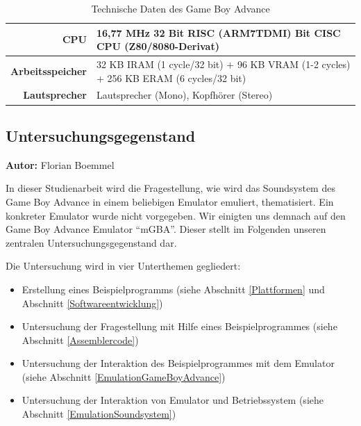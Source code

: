 \documentclass[11pt,a4paper]{scrartcl}
\newcommand{\AutorFlorian} {
    \vspace{-4mm}
    \large \textbf{Autor:} Florian Boemmel \normalsize
    \vspace{2mm}
}
\begin{document}
\begin{table}[h]
    \centering
    \begin{tabular}{ r | p{10cm} }
        \textbf{CPU} & 16,77 MHz 32 Bit RISC (ARM7TDMI)\newline
              8 Bit CISC CPU (Z80/8080-Derivat) \\
        \hline
        \textbf{Arbeitsspeicher} & 32 KB IRAM (1 cycle/32 bit)\newline
                          + 96 KB VRAM (1-2 cycles)\newline
                          + 256 KB ERAM (6 cycles/32 bit) \\
        \hline
        \textbf{Lautsprecher} & Lautsprecher (Mono), Kopfh\"orer (Stereo) \\
    \end{tabular}
    \caption{Technische Daten des Game Boy Advance \cite{GameBoyTechnischeDaten}}
    \label{table:TechnischeDaten}
\end{table}

\newpage

\subsection{Untersuchungsgegenstand}
\AutorFlorian

In dieser Studienarbeit wird die Fragestellung, wie wird das Soundsystem des Game Boy Advance in einem beliebigen Emulator emuliert, thematisiert. Ein konkreter Emulator wurde nicht vorgegeben. Wir einigten uns demnach auf den Game Boy Advance Emulator \enquote{mGBA}. Dieser stellt im Folgenden unseren zentralen Untersuchungsgegenstand dar.

Die Untersuchung wird in vier Unterthemen gegliedert:

\begin{itemize}
    \item Erstellung eines Beispielprogramms (siehe Abschnitt \ref{Plattformen} und Abschnitt \ref{Softwareentwicklung})
    \item Untersuchung der Fragestellung mit Hilfe eines Beispielprogrammes (siehe Abschnitt \ref{Assemblercode})
    \item Untersuchung der Interaktion des Beispielprogrammes mit dem Emulator (siehe Abschnitt \ref{EmulationGameBoyAdvance})
    \item Untersuchung der Interaktion von Emulator und Betriebssystem (siehe Abschnitt \ref{EmulationSoundsystem})
\end{itemize}
\end{document}
